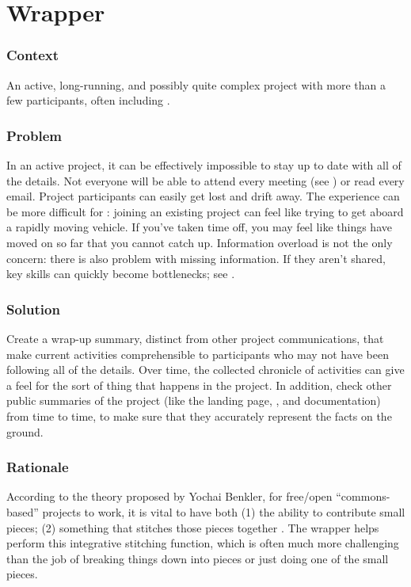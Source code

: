 \begingroup \color{OliveGreen}
\section{Wrapper}\label{sec:Wrapper}

\subsubsection*{Context} An active, long-running, and possibly quite complex project with more than a few participants, often including .  

\subsubsection*{Problem} In an active project, it can be effectively impossible to stay up to date with all of the details.  Not everyone will be able to attend every meeting (see ) or read every email.  Project participants can easily get lost and drift away.  The experience can be more difficult for : joining an existing project can feel like trying to get aboard a rapidly moving vehicle.  If you've taken time off, you may feel like things have moved on so far that you cannot catch up.  Information overload is not the only concern: there is also problem with missing information.  If they aren't shared, key skills can quickly become bottlenecks; see .

\subsubsection*{Solution}
Create a wrap-up summary, distinct from other project communications, that make current activities comprehensible to participants who may not have been following all of the details.  Over time, the collected chronicle of activities can give  a feel for the sort of thing that happens in the project.  In addition, check other public summaries of the project (like the landing page, , and documentation) from time to time, to make sure that they accurately represent the facts on the ground.  

\subsubsection*{Rationale}
According to the theory proposed by Yochai Benkler, for free/open ``commons-based'' projects to work, it is vital to have both (1) the ability to contribute small pieces; (2) something that stitches those pieces together \cite{coases-penguin}. The wrapper helps perform this integrative stitching function, which is often much more challenging than the job of breaking things down into pieces or just doing one of the small pieces.

